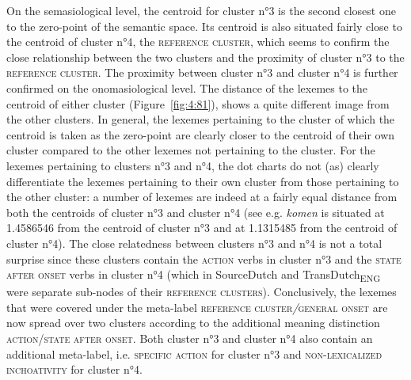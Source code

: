 On the semasiological level, the centroid for cluster n°3 is the second closest one to the zero-point of the semantic space. Its centroid is also situated fairly close to the centroid of cluster n°4, the \textsc{reference cluster}, which seems to confirm the close relationship between the two clusters and the proximity of cluster n°3 to the \textsc{reference cluster}. The proximity between cluster n°3 and cluster n°4 is further confirmed on the onomasiological level. The distance of the lexemes to the centroid of either cluster (Figure~\ref{fig:4:81}), shows a quite different image from the other clusters. In general, the lexemes pertaining to the cluster of which the centroid is taken as the zero-point are clearly closer to the centroid of their own cluster compared to the other lexemes not pertaining to the cluster. For the lexemes pertaining to clusters n°3 and n°4, the dot charts do not (as) clearly differentiate the lexemes pertaining to their own cluster from those pertaining to the other cluster: a number of lexemes are indeed at a fairly equal distance from both the centroids of cluster n°3 and cluster n°4 (see e.g. \textit{komen} is situated at 1.4586546 from the centroid of cluster n°3 and at 1.1315485 from the centroid of cluster n°4). The close relatedness between clusters n°3 and n°4 is not a total surprise since these clusters contain the \textsc{action} verbs in cluster n°3 and the \textsc{state after onset} verbs in cluster n°4 (which in SourceDutch and TransDutch\textsubscript{ENG} were separate sub-nodes of their \textsc{reference clusters}). Conclusively, the lexemes that were covered under the meta-label \textsc{reference cluster}\textit{/}\textsc{general onset} are now spread over two clusters according to the additional meaning distinction \textsc{action}\slash \textsc{state after onset}. Both cluster n°3 and cluster n°4 also contain an additional meta-label, i.e. {\textsc{specific}} \textsc{action} for cluster n°3 and {\textsc{non-lexicalized inchoativity}} for cluster n°4.

